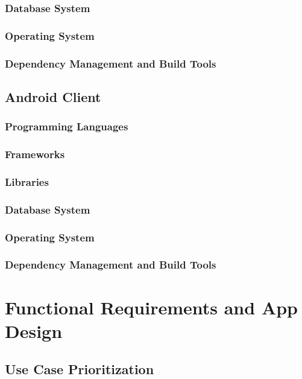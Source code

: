 \documentclass[11pt,fleqn]{book} %
\begin{document}
		\subsection{Database System}
		\subsection{Operating System}
		\subsection{Dependency Management and Build Tools}
	\section{Android Client}
		\subsection{Programming Languages}
		\subsection{Frameworks}
		\subsection{Libraries}
		\subsection{Database System}
		\subsection{Operating System}
		\subsection{Dependency Management and Build Tools}



\chapter{Functional Requirements and App Design}

	\section{Use Case Prioritization}
\end{document}
